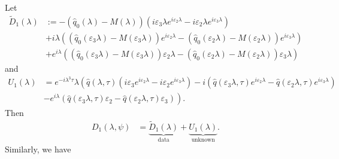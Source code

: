 Let 
\begin{align*}
    \widetilde{D}_1(\lambda) &:= - \left(\widehat{q}_0(\lambda) - M(\lambda)\right)\left(i\varepsilon_3\lambda e^{i\varepsilon_2\lambda} - i\varepsilon_2\lambda e^{i\varepsilon_3\lambda}\right)\\
    &+ i\lambda \left(\left(\widehat{q}_0(\varepsilon_3\lambda) - M(\varepsilon_3\lambda)\right)e^{i\varepsilon_2\lambda} - \left(\widehat{q}_0(\varepsilon_2\lambda) - M(\varepsilon_2\lambda)\right)e^{i\varepsilon_3\lambda}\right)\\
    &+ e^{i\lambda} \left(\left(\widehat{q}_0(\varepsilon_3\lambda) - M(\varepsilon_3\lambda)\right)\varepsilon_2\lambda - \left(\widehat{q}_0(\varepsilon_2\lambda) - M(\varepsilon_2\lambda)\right)\varepsilon_3\lambda\right)
\end{align*}
and
\begin{align*}
    U_1(\lambda) &= e^{-i \lambda^3 \tau}\lambda\left(\widehat{q}(\lambda,\tau)\left(i\varepsilon_3e^{i\varepsilon_2\lambda} - i\varepsilon_2e^{i\varepsilon_3\lambda}\right) - i\left(\widehat{q}(\varepsilon_3\lambda,\tau)e^{i\varepsilon_2\lambda} - \widehat{q}(\varepsilon_2\lambda,\tau)e^{i\varepsilon_3\lambda}\right)\right.\\ 
    &- \left.e^{i\lambda}\left(\widehat{q}(\varepsilon_3\lambda,\tau)\varepsilon_2 - \widehat{q}(\varepsilon_2\lambda,\tau)\varepsilon_3\right)\right).
\end{align*}
Then 
\begin{align*}
    D_1(\lambda,\psi) &= \underbrace{\widetilde{D}_1(\lambda)}_\text{data} + \underbrace{U_1(\lambda)}_\text{unknown}.
\end{align*}
Similarly, we have 
